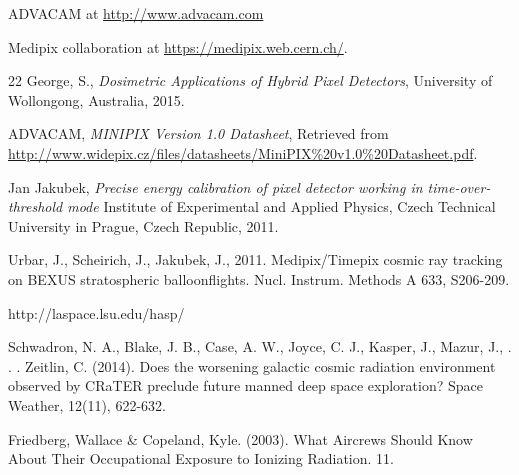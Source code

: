 \begin{thebibliography}{00}
  ADVACAM at \url{http://www.advacam.com}

  Medipix collaboration at \url{https://medipix.web.cern.ch/}.
  
 22
  George, S., \textit{Dosimetric Applications of Hybrid Pixel Detectors}, University of Wollongong, Australia, 2015.

  ADVACAM, \textit{MINIPIX Version 1.0 Datasheet}, Retrieved from \url{http://www.widepix.cz/files/datasheets/MiniPIX\%20v1.0\%20Datasheet.pdf}.

  Jan Jakubek, \textit{Precise energy calibration of pixel detector working in time-over-threshold mode} Institute of Experimental and Applied Physics, Czech Technical University in Prague, Czech Republic, 2011.

Urbar, J., Scheirich, J., Jakubek, J., 2011. Medipix/Timepix cosmic ray tracking on BEXUS stratospheric balloonflights. Nucl. Instrum. Methods A 633, S206-209.
  
http://laspace.lsu.edu/hasp/

Schwadron, N. A., Blake, J. B., Case, A. W., Joyce, C. J., Kasper, J., Mazur, J., . . . Zeitlin, C. (2014). Does the worsening galactic cosmic radiation environment observed by CRaTER preclude future manned deep space exploration? Space Weather, 12(11), 622-632. 

Friedberg, Wallace & Copeland, Kyle. (2003). What Aircrews Should Know About Their Occupational Exposure to Ionizing Radiation. 11. 
\end{thebibliography}
